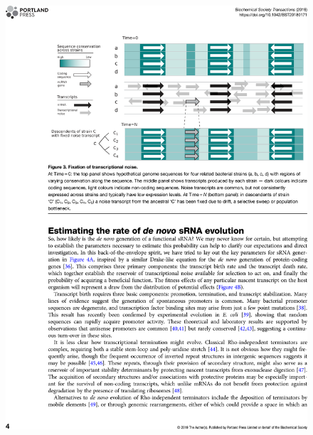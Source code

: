 \begin{figure}
    \centering
    \includegraphics[width=\linewidth]{lit_review/page4.png}
\end{figure}
